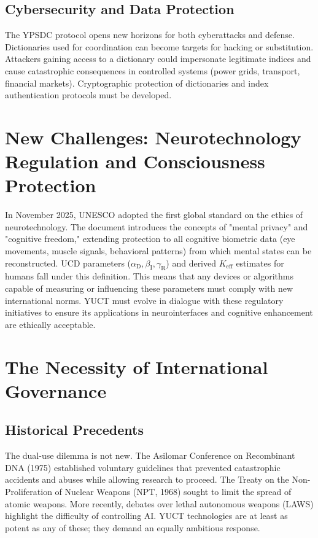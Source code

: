 \documentclass[12pt,a4paper]{article}
\theoremstyle{remark}
\newcommand{\Keff}{K_{\mathrm{eff}}}
\newcommand{\alD}{\alpha_{\mathrm{D}}}
\newcommand{\beI}{\beta_{\mathrm{I}}}
\newcommand{\gaR}{\gamma_{\mathrm{R}}}
\begin{document}
	\subsection{Cybersecurity and Data Protection}
	\label{subsec:cyber}
	
	The YPSDC protocol opens new horizons for both cyberattacks and defense. Dictionaries used for coordination can become targets for hacking or substitution. Attackers gaining access to a dictionary could impersonate legitimate indices and cause catastrophic consequences in controlled systems (power grids, transport, financial markets). Cryptographic protection of dictionaries and index authentication protocols must be developed.
	
	\section{New Challenges: Neurotechnology Regulation and Consciousness Protection}
	\label{sec:neuroethics}
	
	In November 2025, UNESCO adopted the first global standard on the ethics of neurotechnology. The document introduces the concepts of "mental privacy" and "cognitive freedom," extending protection to all cognitive biometric data (eye movements, muscle signals, behavioral patterns) from which mental states can be reconstructed. UCD parameters (\(\alD,\beI,\gaR\)) and derived \(\Keff\) estimates for humans fall under this definition. This means that any devices or algorithms capable of measuring or influencing these parameters must comply with new international norms. YUCT must evolve in dialogue with these regulatory initiatives to ensure its applications in neurointerfaces and cognitive enhancement are ethically acceptable.
	
	\section{The Necessity of International Governance}
	\label{sec:governance}
	
	\subsection{Historical Precedents}
	\label{subsec:precedents}
	
	The dual-use dilemma is not new. The Asilomar Conference on Recombinant DNA (1975) established voluntary guidelines that prevented catastrophic accidents and abuses while allowing research to proceed. The Treaty on the Non-Proliferation of Nuclear Weapons (NPT, 1968) sought to limit the spread of atomic weapons. More recently, debates over lethal autonomous weapons (LAWS) highlight the difficulty of controlling AI. YUCT technologies are at least as potent as any of these; they demand an equally ambitious response.
	
\end{document}
